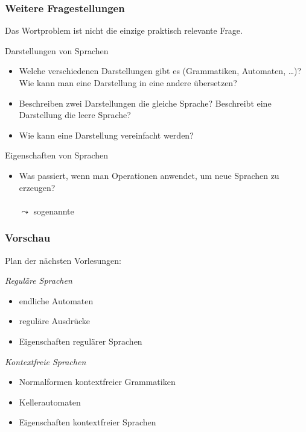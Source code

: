 \documentclass[onlymath]{beamer}
\begin{document}
\begin{frame}\frametitle{Weitere Fragestellungen}

Das Wortproblem ist nicht die einzige praktisch relevante Frage.
\medskip

\alert{Darstellungen von Sprachen}
\begin{itemize}
\item Welche verschiedenen Darstellungen gibt es (Grammatiken, Automaten, \ldots)? Wie kann man eine Darstellung in eine andere übersetzen?
\item Beschreiben zwei Darstellungen die gleiche Sprache? Beschreibt eine Darstellung die leere Sprache?
\item Wie kann eine Darstellung vereinfacht werden?
\end{itemize}

\alert{Eigenschaften von Sprachen}
\begin{itemize}
\item Was passiert, wenn man Operationen anwendet, um neue Sprachen zu erzeugen?\\[1ex]
\\[0.5ex]
$\leadsto$ sogenannte 
\end{itemize}

\end{frame}

\begin{frame}\frametitle{Vorschau}

Plan der nächsten Vorlesungen:
\medskip

\emph{Reguläre Sprachen}
\begin{itemize}
\item endliche Automaten
\item reguläre Ausdrücke
\item Eigenschaften regulärer Sprachen
\end{itemize}

\emph{Kontextfreie Sprachen}
\begin{itemize}
\item Normalformen kontextfreier Grammatiken
\item Kellerautomaten
\item Eigenschaften kontextfreier Sprachen
\end{itemize}

\end{frame}
\end{document}
